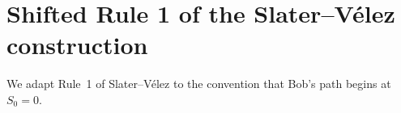 





\section{Shifted Rule 1 of the Slater--Vélez construction}


We adapt Rule~1 of Slater--Vélez \cite{slater1977permutations}
to the convention that Bob's path begins at $S_0=0.$


